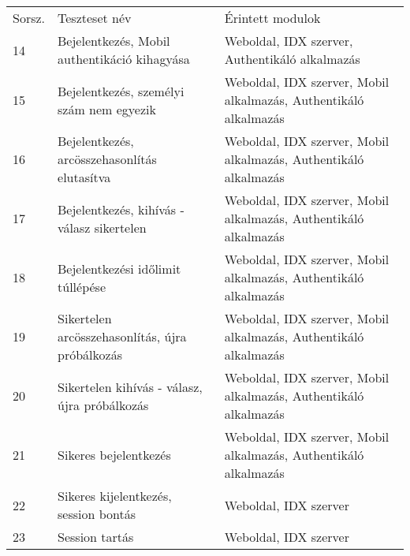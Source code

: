 \begin{tabular}{|p{1cm}|p{8cm} |p{4cm}|}
  \hline
\rowcolor{Title}
\multicolumn{3}{ |c| }{\color{white} Teszteset leírása} \\
  \hline
\rowcolor{Header}
Sorsz. & Teszteset név & Érintett modulok\tabularnewline
\hline 
 
 14  & Bejelentkezés, Mobil authentikáció kihagyása & Weboldal, IDX szerver, Authentikáló alkalmazás \tabularnewline
  \hline
 15  & Bejelentkezés, személyi szám nem egyezik  & Weboldal, IDX szerver, Mobil alkalmazás, Authentikáló alkalmazás \tabularnewline
  \hline
 16  & Bejelentkezés, arcösszehasonlítás elutasítva  & Weboldal, IDX szerver, Mobil alkalmazás, Authentikáló alkalmazás \tabularnewline
  \hline
 17  & Bejelentkezés, kihívás - válasz sikertelen  & Weboldal, IDX szerver, Mobil alkalmazás, Authentikáló alkalmazás \tabularnewline
  \hline
 18  & Bejelentkezési időlimit túllépése  & Weboldal, IDX szerver, Mobil alkalmazás, Authentikáló alkalmazás \tabularnewline
  \hline
 19  & Sikertelen arcösszehasonlítás, újra próbálkozás  & Weboldal, IDX szerver, Mobil alkalmazás, Authentikáló alkalmazás \tabularnewline
  \hline
 20  & Sikertelen kihívás - válasz, újra próbálkozás  & Weboldal, IDX szerver, Mobil alkalmazás, Authentikáló alkalmazás \tabularnewline
  \hline
 21  &Sikeres bejelentkezés  & Weboldal, IDX szerver, Mobil alkalmazás, Authentikáló alkalmazás \tabularnewline
  \hline
 22  &Sikeres kijelentkezés, session bontás  & Weboldal, IDX szerver \tabularnewline
  \hline
 23  & Session tartás  & Weboldal, IDX szerver \tabularnewline
  \hline
\end{tabular}

\newpage